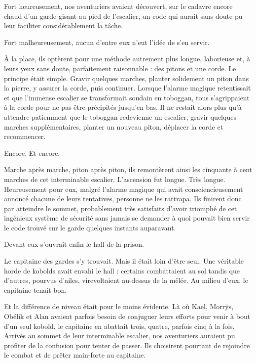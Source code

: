 \begin{narrateur}
Fort heureusement, nos aventuriers avaient découvert, sur le cadavre encore chaud d'un garde gisant au pied de l'escalier, un code qui aurait sans doute pu leur faciliter considérablement la tâche.

Fort malheureusement, aucun d'entre eux n'eut l'idée de s'en servir.
\end{narrateur}

À la place, ils optèrent pour une méthode autrement plus longue, laborieuse et, à leurs yeux sans doute, parfaitement raisonnable : des pitons et une corde. Le principe était simple. Gravir quelques marches, planter solidement un piton dans la pierre, y assurer la corde, puis continuer. Lorsque l'alarme magique retentissait et que l'immense escalier se transformait soudain en toboggan, tous s'agrippaient à la corde pour ne pas être précipités jusqu'en bas. Il ne restait alors plus qu'à attendre patiemment que le toboggan redevienne un escalier, gravir quelques marches supplémentaires, planter un nouveau piton, déplacer la corde et recommencer.

Encore. Et encore.

Marche après marche, piton après piton, ils remontèrent ainsi les cinquante à cent marches de cet interminable escalier. L'ascension fut longue. Très longue. Heureusement pour eux, malgré l'alarme magique qui avait consciencieusement annoncé chacune de leurs tentatives, personne ne les rattrapa. Ils finirent donc par atteindre le sommet, probablement très satisfaits d'avoir triomphé de cet ingénieux système de sécurité sans jamais se demander à quoi pouvait bien servir le code trouvé sur le garde quelques instants auparavant.

Devant eux s'ouvrait enfin le hall de la prison.

\scenebreak

Le capitaine des gardes s'y trouvait. Mais il était loin d'être seul. Une véritable horde de kobolds avait envahi le hall : certains combattaient au sol tandis que d'autres, pourvus d'ailes, virevoltaient au-dessus de la mêlée. Au milieu d'eux, le capitaine tenait bon.

Et la différence de niveau était pour le moins évidente. Là où Kael, Morrÿs, Obélik et Alan avaient parfois besoin de conjuguer leurs efforts pour venir à bout d'un seul kobold, le capitaine en abattait trois, quatre, parfois cinq à la fois. Arrivés au sommet de leur interminable escalier, nos aventuriers auraient pu profiter de la confusion pour tenter de passer. Ils choisirent pourtant de rejoindre le combat et de prêter main-forte au capitaine.

